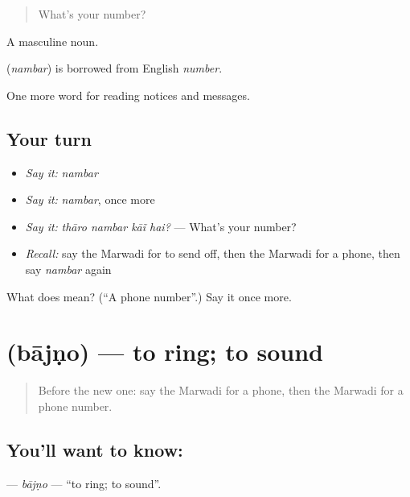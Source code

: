 \begin{quote}
What's your number?
\end{quote}

A masculine noun.

\begin{cousinweb}
\textbf{} (\emph{nambar}) is borrowed from English \emph{number}.
\end{cousinweb}

\begin{grammarlens}[title={What you've built}]
One more word for reading notices and messages.
\end{grammarlens}

\subsection*{Your turn}
\begin{itemize}
\raggedright
  \item \emph{Say it:} \emph{nambar}
  \item \emph{Say it:} \emph{nambar}, once more
  \item \emph{Say it:} \emph{thāro nambar kāĩ hai?} — What's your number?
  \item \emph{Recall:} say the Marwadi for to send off, then the Marwadi for a phone, then say \emph{nambar} again
\end{itemize}

\begin{tcolorbox}[breakable,colback=teal!4,colframe=teal!35!black,title={Before you move on}]
What does  mean? (\textquotedblleft{}A phone number\textquotedblright{}.) Say it once more.
\end{tcolorbox}
\section[\texorpdfstring{\mw{बाजणो} (bājṇo)}{बाजणो (bājṇo)}]{ (bājṇo) — to ring; to sound}

\label{lesson:MW-C197-bajno}



\begin{quote}
Before the new one: say the Marwadi for a phone, then the Marwadi for a phone number.
\end{quote}

\subsection*{You'll want to know: }
\textbf{} — \emph{bājṇo} — \textquotedblleft{}to ring; to sound\textquotedblright{}.

